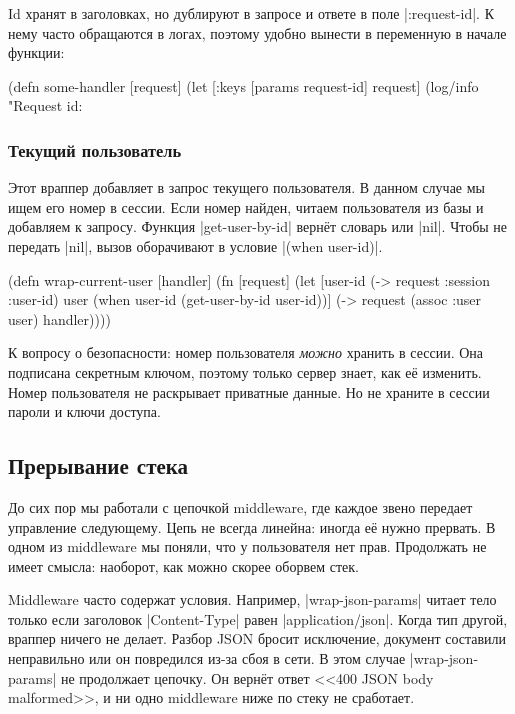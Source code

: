 Id хранят в заголовках, но дублируют в запросе и ответе в поле
\spverb|:request-id|. К нему часто обращаются в логах, поэтому удобно вынести в
переменную в начале функции:

\begin{english}
  \begin{clojure}
(defn some-handler [request]
  (let [{:keys [params request-id]} request]
    (log/info "Request id: %
  \end{clojure}
\end{english}

\subsubsection*{Текущий пользователь}

Этот враппер добавляет в запрос текущего пользователя. В данном случае мы ищем
его номер в сессии. Если номер найден, читаем пользователя из базы и добавляем к
запросу. Функция \spverb|get-user-by-id| верн\"{е}т словарь или \spverb|nil|. Чтобы
не передать \spverb|nil|, вызов оборачивают в условие \spverb|(when user-id)|.

\begin{english}
  \begin{clojure}
(defn wrap-current-user [handler]
  (fn [request]
    (let [user-id (-> request :session :user-id)
          user (when user-id
                 (get-user-by-id user-id))]
      (-> request
          (assoc :user user)
          handler))))
  \end{clojure}
\end{english}

К вопросу о безопасности: номер пользователя \emph{можно} хранить в сессии. Она
подписана секретным ключом, поэтому только сервер знает, как е\"{е} изменить. Номер
пользователя не раскрывает приватные данные. Но не храните в сессии пароли и
ключи доступа.

\subsection{Прерывание стека}

До сих пор мы работали с цепочкой middleware, где каждое звено передает
управление следующему. Цепь не всегда линейна: иногда е\"{е} нужно прервать. В одном
из middleware мы поняли, что у пользователя нет прав. Продолжать не имеет
смысла: наоборот, как можно скорее оборвем стек.

Middleware часто содержат условия. Например, \spverb|wrap-json-params| читает
тело только если заголовок \spverb|Content-Type| равен
\spverb|application/json|. Когда тип другой, враппер ничего не делает. Разбор
JSON бросит исключение, документ составили неправильно или он повредился из-за
сбоя в сети. В этом случае \spverb|wrap-json-params| не продолжает цепочку. Он
верн\"{е}т ответ <<400 JSON body malformed>>, и ни одно middleware ниже по стеку не
сработает.

